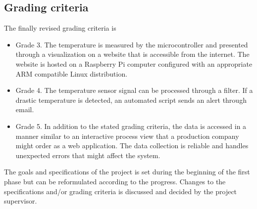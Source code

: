 \newpage

\subsection{Grading criteria}%
\label{sub:grading_criteria}
The finally revised grading criteria is
\begin{itemize}
  \item 
    Grade 3. The temperature is measured by the microcontroller and presented through a visualization on a website that is accessible from the internet. The website is hosted on a Raspberry Pi computer configured with an appropriate ARM compatible Linux distribution.
  \item 
   Grade 4. The temperature sensor signal can be processed through a filter. If a drastic temperature is detected, an automated script sends an alert through email. 
  \item
   Grade 5. In addition to the stated grading criteria, the data is accessed in a manner similar to an interactive process view that a production company might order as a web application. The data collection is reliable and handles unexpected errors that might affect the system.
\end{itemize}

The goals and specifications of the project is set during the beginning of the first phase but can be reformulated according to the progress. Changes to the specifications and/or grading criteria is discussed and decided by the project supervisor.
